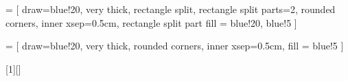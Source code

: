 
\newcommand{\red}[1]{{\color{red}#1}}
\newcommand{\blue}[1]{{\color{blue}#1}}
\newcommand{\green}[1]{{\color{darkgreen}#1}}

\newcommand{\spuno}[2]{\red{#1}\rightarrow(\blue{#2}\rightarrow \red{#1})}

\newcommand{\spdos}[3]{(\red{#1}\rightarrow(\blue{#2}\rightarrow\green{#3}))\rightarrow((\red{#1}\rightarrow\blue{#2})\rightarrow(\red{#1}\rightarrow\green{#3}))}

\newcommand{\sptres}[2]{(\lnot\red{#1}\rightarrow\lnot\blue{#2})\rightarrow(\blue{#2}\rightarrow\red{#1})}
	
\newcommand{\nat}{\ensuremath{\mathbb{N}}}
\newcommand{\dom}[1]{\text{dom}(#1)}
\newcommand{\xDots}[2]{\ensuremath{#1_1,\dots, #1_{#2}}}

\newcommand{\comp}[4]{\ensuremath{#1(#3_1(\xDots{x}{n}),\dots,#3_#2(\xDots{x}{n}))}}
	
	
\newcommand{\resta}{\dot{-}}

\newcommand{\sincr}[1]{\ensuremath{#1 \leftarrow #1 + 1}}
\newcommand{\sdecr}[1]{\ensuremath{#1 \leftarrow #1 - 1}}
\newcommand{\sif}[2]{\ensuremath{\text{IF }#1 \neq 0 \text{ GOTO } #2}}
\newcommand{\sgoto}[1]{\ensuremath{\text{GOTO } #1}}

\newcommand{\imagen}[4]{
\begin{figure}[ht]
	\centering
	\texttt{[image: \#2]}
	\caption{#3}
	\label{#4}
\end{figure}
}



\usetikzlibrary{shapes.multipart}

 = [
draw=blue!20, very thick,
rectangle split, rectangle split parts=2, rounded corners, inner xsep=0.5cm,
rectangle split part fill = {blue!20, blue!5}
]

 = [
draw=blue!20, very thick,
rounded corners, inner xsep=0.5cm,
fill = blue!5
]

[1][]{%
\begin{center}
\end{center}
}

